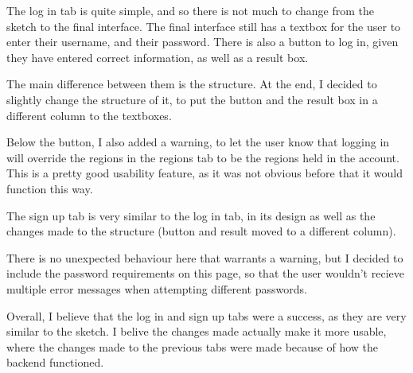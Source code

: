 \documentclass[12pt]{report}
\begin{document}
The log in tab is quite simple, and so there is not much to change from the sketch to the final interface. The final interface still has a textbox for the user to enter their username, and their password. There is also a button to log in, given they have entered correct information, as well as a result box.

The main difference between them is the structure. At the end, I decided to slightly change the structure of it, to put the button and the result box in a different column to the textboxes.

Below the button, I also added a warning, to let the user know that logging in will override the regions in the regions tab to be the regions held in the account. This is a pretty good usability feature, as it was not obvious before that it would function this way.

The sign up tab is very similar to the log in tab, in its design as well as the changes made to the structure (button and result moved to a different column).

There is no unexpected behaviour here that warrants a warning, but I decided to include the password requirements on this page, so that the user wouldn't recieve multiple error messages when attempting different passwords.

Overall, I believe that the log in and sign up tabs were a success, as they are very similar to the sketch. I belive the changes made actually make it more usable, where the changes made to the previous tabs were made because of how the backend functioned.
\end{document}
